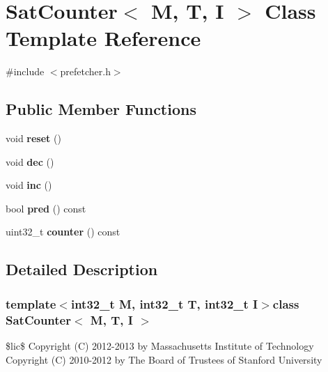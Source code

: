 \hypertarget{classSatCounter}{\section{Sat\-Counter$<$ M, T, I $>$ Class Template Reference}
\label{classSatCounter}
}


{\ttfamily \#include $<$prefetcher.\-h$>$}

\subsection*{Public Member Functions}
\begin{DoxyCompactItemize}
\item 
\hypertarget{classSatCounter_a6756753798da05cf3e70dfc8c323baaa}{void {\bfseries reset} ()}\label{classSatCounter_a6756753798da05cf3e70dfc8c323baaa}

\item 
\hypertarget{classSatCounter_a6c2a59194ffaa90e35c850c75e165099}{void {\bfseries dec} ()}\label{classSatCounter_a6c2a59194ffaa90e35c850c75e165099}

\item 
\hypertarget{classSatCounter_a470adce01e3de69bdd920a42688d8e9e}{void {\bfseries inc} ()}\label{classSatCounter_a470adce01e3de69bdd920a42688d8e9e}

\item 
\hypertarget{classSatCounter_af947aca21a0cf6141689c22ffda54d73}{bool {\bfseries pred} () const }\label{classSatCounter_af947aca21a0cf6141689c22ffda54d73}

\item 
\hypertarget{classSatCounter_aefac107174c110960d5a91990e3447d5}{uint32\-\_\-t {\bfseries counter} () const }\label{classSatCounter_aefac107174c110960d5a91990e3447d5}

\end{DoxyCompactItemize}


\subsection{Detailed Description}
\subsubsection*{template$<$int32\-\_\-t M, int32\-\_\-t T, int32\-\_\-t I$>$class Sat\-Counter$<$ M, T, I $>$}

\$lic\$ Copyright (C) 2012-\/2013 by Massachusetts Institute of Technology Copyright (C) 2010-\/2012 by The Board of Trustees of Stanford University

